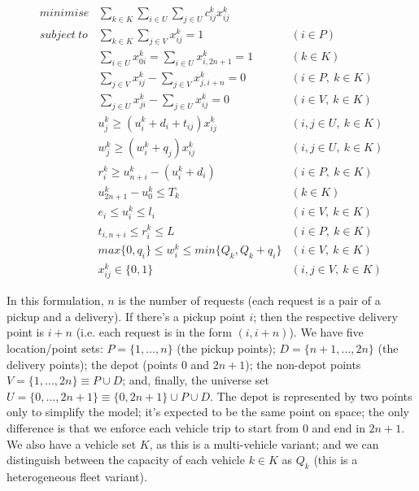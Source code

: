\documentclass[english,plano-doutorado,twoside]{iiufrgs}
\begin{document}
\begin{align}
minimise &\sum_{k \in K}\sum_{i \in U}\sum_{j \in U} c^{k}_{ij} x^{k}_{ij} &\label{eq:objfun}\\
subject~to &\sum_{k \in K}\sum_{j \in V} x^{k}_{ij} = 1 & (i \in P)\label{eq:no_divide}\\
           &\sum_{i \in U}x^{k}_{0i} = \sum_{i \in U}x^{k}_{i,2n+1} = 1 & (k \in K)\label{eq:end_and_begin}\\
           &\sum_{j \in V}x^{k}_{ij} - \sum_{j \in V}x^{k}_{j,i+n} = 0& (i \in P,~k \in K)\label{eq:same_request_same_vehicle}\\
           &\sum_{j \in U}x^{k}_{ji} - \sum_{j \in U}x^{k}_{ij} = 0& (i \in V,~k \in K)\label{eq:no_bus_teleport}\\
           &u^{k}_{j} \geq (u^{k}_{i} + d_i + t_{ij})x^{k}_{ij} & (i,j \in U,~k\in K)\label{eq:travel_times}\\
           &w^{k}_{j} \geq (w^{k}_{i} + q_j)x^{k}_{ij} & (i,j \in U,~k\in K)\label{eq:capacity}\\
           &r^{k}_{i} \geq u^{k}_{n+i} -(u^{k}_{i} + d_i) & (i \in P,~k\in K)\label{eq:ride_time}\\
           &u^{k}_{2n+1} - u^k_0 \leq T_k & (k \in K)\label{eq:trip_time}\\
           &e_i \leq u^k_i \leq l_i & (i \in V,~k\in K)\label{eq:time_windows}\\
           &t_{i,n+i} \leq r^k_i \leq L & (i \in P,~k\in K)\label{eq:max_ride_time}\\
           &max\{0,q_i\} \leq w^k_i \leq min\{Q_k, Q_k + q_i\}&(i \in V,~k\in K)\label{eq:capacity2}\\
           &x^{k}_{ij} \in \{0,1\}&(i,j \in V,~k\in K)\label{eq:boolean}
\end{align}

In this formulation, \(n\) is the number of requests (each request is a pair of a pickup and a delivery). If there's a pickup point \(i\); then the respective delivery point is \(i + n\) (i.e. each request is in the form \((i, i + n)\)). We have five location/point sets: \(P = \{1, \dots, n\}\) (the pickup points); \(D = \{n+1, \dots, 2n\}\) (the delivery points); the depot (points \(0\) and \(2n + 1\)); the non-depot points \(V = \{1, \dots, 2n\} \equiv P \cup D\); and, finally, the universe set \(U = \{0, \dots, 2n + 1\} \equiv \{0, 2n + 1\} \cup P \cup D\). The depot is represented by two points only to simplify the model; it's expected to be the same point on space; the only difference is that we enforce each vehicle trip to start from \(0\) and end in \(2n+1\). We also have a vehicle set \(K\), as this is a multi-vehicle variant; and we can distinguish between the capacity of each vehicle \(k \in K\) as \(Q_k\) (this is a heterogeneous fleet variant).
\end{document}
